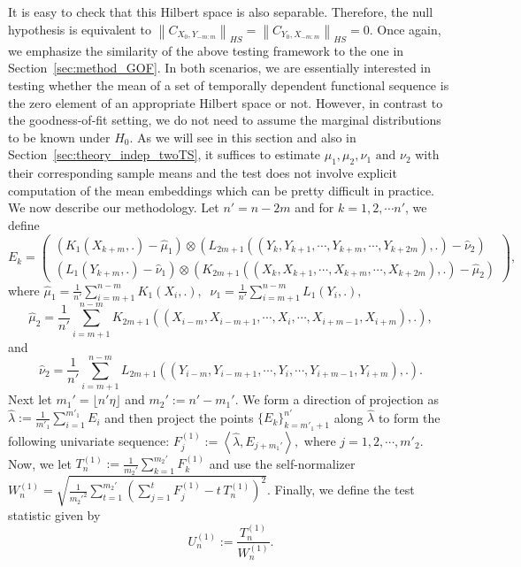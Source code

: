 \documentclass[11pt]{article}
\theoremstyle{plain}
\theoremstyle{definition}
\theoremstyle{remark}
\begin{document}
\noindent It is easy to check that this Hilbert space is also separable. Therefore, the null hypothesis is equivalent to $\left\|C_{X_0,Y_{-m:m}}\right\|_{HS}= \left\|C_{Y_0,X_{-m:m}}\right\|_{HS}=0$. Once again, we emphasize the similarity of the above testing framework to the one in Section~\ref{sec:method_GOF}. In both scenarios, we are essentially interested in testing whether the mean of a set of temporally dependent functional sequence is the zero element of an appropriate Hilbert space or not. However, in contrast to the goodness-of-fit setting, we do not need to assume the marginal distributions to be known under $H_0$. As we will see in this section and also in Section~\ref{sec:theory_indep_twoTS}, it suffices to estimate $\mu_1,\mu_2,\nu_1\text{ and }\nu_2$ with their corresponding sample means and the test does not involve explicit computation of the mean embeddings which can be pretty difficult in practice. We now describe our  methodology.
Let $n'=n-2m$ and for $k=1,2,\cdots n'$, we define
\begin{equation}\label{eqn:Ei_twoTS}
    E_k=\begin{pmatrix}
    (K_1(X_{k+m},.)-\hat{\mu}_1)\otimes (L_{2m+1}((Y_{k},Y_{k+1},\cdots,Y_{k+m},\cdots, Y_{k+2m}),.)-\hat{\nu}_{2})\\
    (L_1(Y_{k+m},.)-\hat{\nu}_1)\otimes (K_{2m+1}((X_{k},X_{k+1},\cdots,X_{k+m},\cdots, X_{k+2m}),.)-\hat{\mu}_{2})
\end{pmatrix},
\end{equation}
where 
$\hat{\mu}_1=\frac{1}{n'}\sum_{i=m+1}^{n-m}K_1(X_i,.),\;\;\hat{\nu}_1=\frac{1}{n'}\sum_{i=m+1}^{n-m}L_1(Y_i,.),$
$$\hat{\mu}_2=\frac{1}{n'}\sum_{i=m+1}^{n-m}K_{2m+1}((X_{i-m},X_{i-m+1},\cdots,X_{i},\cdots, X_{i+m-1}, X_{i+m}),.),$$
and
$$\hat{\nu}_2=\frac{1}{n'}\sum_{i=m+1}^{n-m}L_{2m+1}((Y_{i-m},Y_{i-m+1},\cdots,Y_{i},\cdots, Y_{i+m-1}, Y_{i+m}),.).$$  
\noindent  Next let $m_1'=\lfloor n' \eta\rfloor$ and $m_2':=n'-m_1'.$ We form a direction of projection as $\hat{\lambda}:=\frac{1}{m'_1}\sum_{i=1}^{m'_1}E_i$ and then project the points $\{E_k\}_{k=m'_1+1}^{n'}$ along $\hat{\lambda}$ to form the following univariate sequence: $F_j^{(1)}:=\left\langle \hat{\lambda}, E_{j+m_1'}\right\rangle,$ where $j=1,2,\cdots,m'_2$. Now, we let $T^{(1)}_n:=\frac{1}{m_2'}\sum_{k=1}^{m_2'}F^{(1)}_k$ and use the self-normalizer ${W_n^{(1)}}=\sqrt{\frac{1}{m_2'^2}\sum_{t=1}^{m_2'}\left(\sum_{j=1}^t F^{(1)}_j-t\, T^{(1)}_n\right)^2}$. Finally, we define the test statistic given by \begin{equation}\label{eqn:test_stat_indep_twoTS}
    U^{(1)}_n:=\frac{T^{(1)}_n}{W^{(1)}_n}.
\end{equation}
\end{document}
